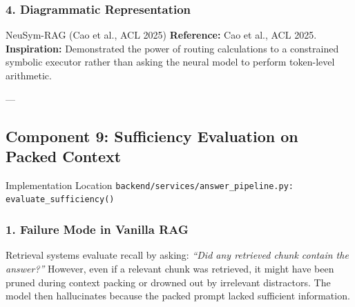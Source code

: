 \documentclass[11pt,a4paper]{article}
\begin{document}
\subsubsection{4. Diagrammatic Representation}
\begin{center}
\end{center}

\begin{inspirationbox}{NeuSym-RAG (Cao et al., ACL 2025)}
\textbf{Reference:} Cao et al., ACL 2025.\\
\textbf{Inspiration:} Demonstrated the power of routing calculations to a constrained symbolic executor rather than asking the neural model to perform token-level arithmetic.
\end{inspirationbox}

---

\subsection{Component 9: Sufficiency Evaluation on Packed Context}
\begin{codebox}{Implementation Location}
\texttt{backend/services/answer\_pipeline.py: evaluate\_sufficiency()}
\end{codebox}

\subsubsection{1. Failure Mode in Vanilla RAG}
Retrieval systems evaluate recall by asking: \emph{``Did any retrieved chunk contain the answer?''} However, even if a relevant chunk was retrieved, it might have been pruned during context packing or drowned out by irrelevant distractors. The model then hallucinates because the packed prompt lacked sufficient information.
\end{document}
